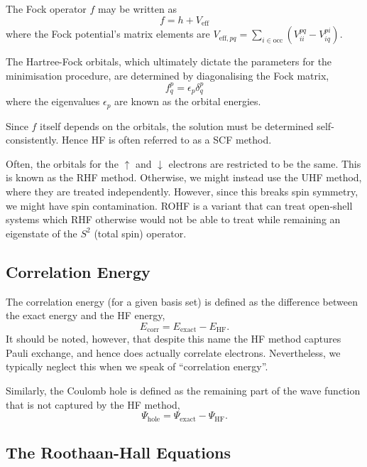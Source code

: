The Fock operator $f$ may be written as
\begin{equation}
    f = h + V_\mathrm{eff}
\end{equation}
where the Fock potential's matrix elements are $V_{\mathrm{eff},pq}=\sum_{i\in\mathrm{occ}}(V^{pq}_{ii}-V^{pi}_{iq})$.

The Hartree-Fock orbitals, which ultimately dictate the parameters for the minimisation procedure, are determined by diagonalising the Fock matrix,
\begin{equation}
    f^p_{q} = \epsilon_p\delta^p_{q}
\end{equation}
where the eigenvalues $\epsilon_p$ are known as the orbital energies.

Since $f$ itself depends on the orbitals, the solution must be determined self-consistently. Hence \gls{HF} is often referred to as a \gls{SCF} method.

Often, the orbitals for the $\uparrow$ and $\downarrow$ electrons are restricted to be the same. This is known as the \gls{RHF} method. Otherwise, we might instead use the \gls{UHF} method, where they are treated independently. However, since this breaks spin symmetry, we might have spin contamination. \Gls{ROHF} is a variant that can treat open-shell systems which \gls{RHF} otherwise would not be able to treat while remaining an eigenstate of the $S^2$ (total spin) operator.

\subsection{Correlation Energy}

The correlation energy (for a given basis set) is defined as the difference between the exact energy and the \gls{HF} energy,
\begin{equation}
E_\mathrm{corr} = E_\mathrm{exact} - E_\mathrm{HF}.
\end{equation}
It should be noted, however, that despite this name the \gls{HF} method captures Pauli exchange, and hence does actually correlate electrons. Nevertheless, we typically neglect this when we speak of ``correlation energy''.

Similarly, the Coulomb hole is defined as the remaining part of the wave function that is not captured by the \gls{HF} method,
\begin{equation}
    \Psi_\mathrm{hole} = \Psi_\mathrm{exact} - \Psi_\mathrm{HF}.
\end{equation}

\subsection{The Roothaan-Hall Equations}

